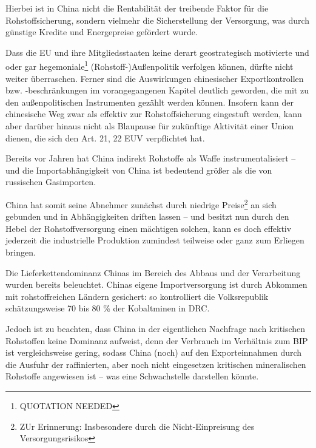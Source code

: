 \documentclass[12pt,a4paper,oneside]{book} %
\begin{document}
Hierbei ist in China nicht die Rentabilität der treibende Faktor für die Rohstoffsicherung, sondern vielmehr die Sicherstellung der Versorgung, was durch günstige Kredite und Energepreise gefördert wurde.\autocite{Oxford Analytica: Critical minerals will be a global faultline for years}


Dass die EU und ihre Mitgliedsstaaten keine derart geostrategisch motivierte und oder gar hegemoniale\footnote{QUOTATION NEEDED} (Rohstoff-)Außenpolitik verfolgen können, dürfte nicht weiter überraschen. Ferner sind die Auswirkungen chinesischer Exportkontrollen bzw. -beschränkungen im vorangegangenen Kapitel deutlich geworden, die mit zu den außenpolitischen Instrumenten gezählt werden können. Insofern kann der chinesische Weg zwar als effektiv zur Rohstoffsicherung eingestuft werden, kann aber darüber hinaus nicht als Blaupause für zukünftige Aktivität einer Union dienen, die sich den Art. 21, 22 EUV verpflichtet hat.

Bereits vor Jahren hat China indirekt Rohstoffe als Waffe instrumentalisiert -- und die Importabhängigkeit von China ist bedeutend größer als die von russischen Gasimporten.\autocite{BDI. Rohstoffkongress: Deutschland braucht eine strategische Rohstoffpolitik}

China hat somit seine Abnehmer zunächst durch niedrige Preise\footnote{ZUr Erinnerung: Insbesondere durch die Nicht-Einpreisung des Versorgungsrisikos} an sich gebunden und in Abhängigkeiten driften lassen -- und besitzt nun durch den Hebel der Rohstoffversorgung einen mächtigen solchen, kann es doch effektiv jederzeit die industrielle Produktion zumindest teilweise oder ganz zum Erliegen bringen.

Die Lieferkettendominanz Chinas im Bereich des Abbaus und der Verarbeitung wurden bereits beleuchtet. Chinas eigene Importversorgung ist durch Abkommen mit rohstoffreichen Ländern gesichert: so kontrolliert die Volksrepublik schätzungsweise 70 bis 80 \% der Kobaltminen in DRC.

Jedoch ist zu beachten, dass China in der eigentlichen Nachfrage nach kritischen Rohstoffen keine Dominanz aufweist, denn der Verbrauch im Verhältnis zum BIP ist vergleichsweise gering, sodass China (noch) auf den Exporteinnahmen durch die Ausfuhr der raffinierten, aber noch nicht eingesetzen kritischen mineralischen Rohstoffe angewiesen ist -- was eine Schwachstelle darstellen könnte.
\end{document}
